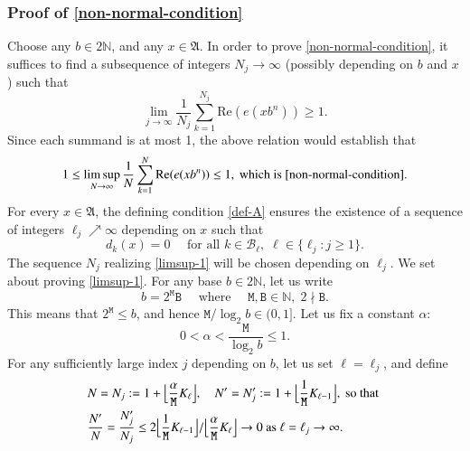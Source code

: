 \documentclass[12pt, twoside]{article}
\theoremstyle{definition}
\numberwithin{equation}{section}
\begin{document}
\subsubsection{Proof of \eqref{non-normal-condition}} 
Choose any $b \in 2\mathbb N$, and any $x \in \mathfrak A$. In order to prove \eqref{non-normal-condition}, it suffices to find a subsequence of integers $N_j \rightarrow \infty$ (possibly depending on $b$ and $x$) such that
\begin{equation} \label{limsup-1} 
 \lim_{j \rightarrow \infty}\frac{1}{N_j} \sum_{k=1}^{N_j} \text{Re}(e(xb^n)) \geq 1. 
\end{equation} 
Since each summand is at most 1, the above relation would establish that
\[ 1 \leq \limsup_{N \rightarrow \infty}\frac{1}{N} \sum_{k=1}^{N} \text{Re}(e(xb^n)) \leq 1, \text{ which is \eqref{non-normal-condition}}.\] 
For every $x \in \mathfrak A$, the defining condition \eqref{def-A} ensures the existence of a sequence of integers $\ell_j \nearrow \infty$ depending on $x$ such that 
\begin{equation}  \label{zero-blocks}
d_k(x) = 0 \quad \text{ for all } k \in \mathcal B_{\ell}, \; \ell \in \{\ell_j : j \geq 1 \}. 
\end{equation}  
The sequence $N_j$ realizing \eqref{limsup-1} will be chosen depending on $\ell_j$. 
\vskip0.15in
\noindent We set about proving \eqref{limsup-1}. For any base $b \in 2 \mathbb N$, let us write 
\begin{equation} \label{even-b} 
b = 2^{\mathtt M} \mathtt B \quad \text{ where } \quad \mathtt M, \mathtt B \in \mathbb N, \; 2 \nmid \mathtt B. 
\end{equation} 
This means that $2^{\mathtt M} \leq b$, and hence $\mathtt M/\log_2 b \in (0,1]$. Let us fix a constant $\alpha$:
\begin{equation} \label{def-alpha} 
0 < \alpha < \frac{\mathtt M}{\log_2 b} \leq 1. 
\end{equation}    
For any sufficiently large index $j$ depending on $b$, let us set $\ell = \ell_j$, and define 
\begin{align} 
&N = N_j  := 1 + \Bigl\lfloor \frac{\alpha}{\mathtt M} K_{\ell} \Bigr\rfloor, \quad N' = N'_j := 1 + \Bigl\lfloor \frac{1}{\mathtt M} K_{\ell-1} \Bigr\rfloor ,  \text{ so that } \label{N-N'} \\  &\frac{N'}{N} = \frac{N'_j}{N_j}\leq 2{\Bigl\lfloor \frac{1}{\mathtt M} K_{\ell-1} \Bigr \rfloor}/{\Bigl\lfloor \frac{\alpha}{\mathtt M} K_{\ell} \Bigr\rfloor} \rightarrow 0 \text{ as } \ell = \ell_j \rightarrow \infty. \label{N'/N}
\end{align} 
\end{document}
